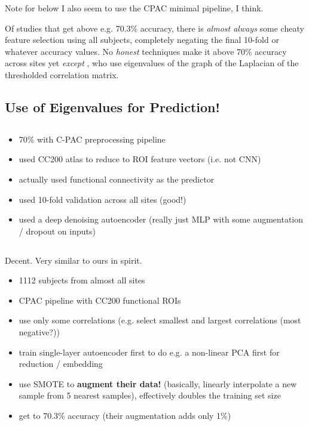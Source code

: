 \documentclass[10pt]{article}
\begin{document}
Note for below I also seem to use the CPAC minimal pipeline, I think.

Of studies that get above e.g. 70.3\% accuracy, there is \emph{almost always} some cheaty feature
selection using all subjects, completely negating the final 10-fold or whatever accuracy values. No
\emph{honest} techniques make it above 70\% accuracy across sites yet \emph{except}
\citet{mostafaDiagnosisAutismSpectrum2019,yinDiagnosisAutismSpectrum2021}, who use eigenvalues of
the graph of the Laplacian of the thresholded correlation matrix.

\subsection{Use of Eigenvalues for Prediction! \citet{mostafaDiagnosisAutismSpectrum2019}} \label{eig-pred}



\subsection{\citet{heinsfeldIdentificationAutismSpectrum2018}}

\begin{itemize}
  \item 70\% with C-PAC preprocessing pipeline
  \item used CC200 atlas to reduce to ROI feature vectors (i.e. not CNN)
  \item actually used functional connectivity as the predictor
  \item used 10-fold validation across all sites (good!)
  \item used a deep denoising autoencoder (really just MLP with some augmentation / dropout on inputs)
\end{itemize}
\subsection{\citet{eslamiASDDiagNetHybridLearning2019}}

Decent. Very similar to ours in spirit.

\begin{itemize}
  \item 1112 subjects from almost all sites
  \item CPAC pipeline with CC200 functional ROIs
  \item use only some correlations (e.g. select smallest and largest correlations (most negative?))
  \item train single-layer autoencoder first to do e.g. a non-linear PCA first for reduction /
  embedding
  \item use SMOTE to \textbf{augment their data!} (basically, linearly interpolate a new sample from
  5 nearest samples), effectively doubles the training set size
  \item get to 70.3\% accuracy (their augmentation adds only 1\%)
\end{itemize}
\end{document}
